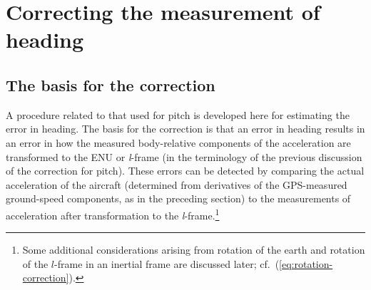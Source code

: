 \documentclass[english,british,amtd,bookmarks=false,unicode=true]{copernicus}\usepackage[]{graphicx}\usepackage[]{color}
\begin{document}
\section{Correcting the measurement of heading\label{sec:heading-correction}}


\subsection{The basis for the correction}

A procedure related to that used for pitch is developed here for estimating
the error in heading. The basis for the correction is that an error
in heading results in an error in how the measured body-relative components
of the acceleration are transformed to the ENU or \emph{l}-frame (in
the terminology of the previous discussion of the correction for pitch).
These errors can be detected by comparing the actual acceleration
of the aircraft (determined from derivatives of the GPS-measured ground-speed
components, as in the preceding section) to the measurements of acceleration
after transformation to the \emph{l}-frame.\footnote{Some additional considerations arising from rotation of the earth
and rotation of the $l$-frame in an inertial frame are discussed
later; cf.~(\ref{eq:rotation-correction}).} 
\end{document}
